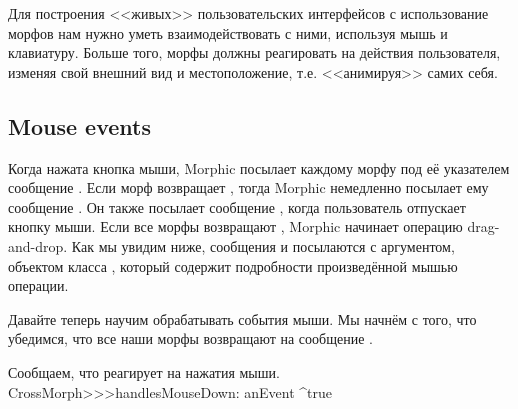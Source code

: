 \documentclass[a4paper,10pt,twoside]{book}
\begin{document}
Для построения <<живых>> пользовательских интерфейсов с использование морфов нам нужно уметь взаимодействовать с ними, используя мышь и клавиатуру.
Больше того, морфы должны реагировать на действия пользователя, изменяя свой внешний вид и местоположение, т.е. <<анимируя>> самих себя.


\subsection{Mouse events}

Когда нажата кнопка мыши, Morphic посылает каждому морфу под её указателем сообщение . Если морф возвращает , тогда Morphic немедленно посылает ему сообщение . Он также посылает сообщение , когда пользователь отпускает кнопку мыши.
Если все морфы возвращают , Morphic начинает операцию drag-and-drop.
Как мы увидим ниже, сообщения  и  посылаются с аргументом, объектом класса , который содержит подробности произведённой мышью операции.

Давайте теперь научим  обрабатывать события мыши.
Мы начнём с того, что убедимся, что все наши морфы возвращают  на сообщение .

\begin{method}{Сообщаем, что  реагирует на нажатия мыши.}
CrossMorph>>>handlesMouseDown: anEvent
	^true
\end{method}
\end{document}
